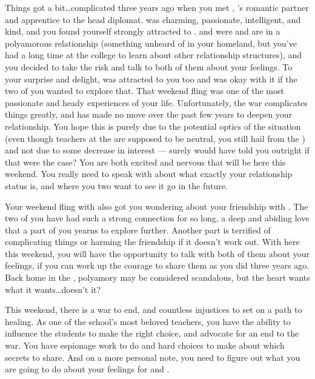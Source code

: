 \documentclass[char]{GL2020}
\begin{document}
{Things got a bit\ldots complicated three years ago when you met \cJuniorStatesman{\full}, \cBeetle{}’s romantic partner and apprentice to the head \pShippie{} diplomat. \cJuniorStatesman{} was charming, passionate, intelligent, and kind, and you found yourself strongly attracted to \cJuniorStatesman{\them}. \cJuniorStatesman{} and \cBeetle{} were and are in a polyamorous relationship (something unheard of in your homeland, but you’ve had a long time at the college to learn about other relationship structures), and you decided to take the risk and talk to both of them about your feelings. To your surprise and delight, \cJuniorStatesman{} was attracted to you too and \cBeetle{} was okay with it if the two of you wanted to explore that. That weekend fling was one of the most passionate and heady experiences of your life. Unfortunately, the war complicates things greatly, and \cJuniorStatesman{} has made no move over the past few years to deepen your relationship. You hope this is purely due to the potential optics of the situation (even though teachers at the \pSc{} are supposed to be neutral, you still hail from the \pTech{}) and not due to some decrease in interest — surely \cJuniorStatesman{} would have told you outright if that were the case? You are both excited and nervous that \cJuniorStatesman{} will be here this weekend. You really need to speak with \cJuniorStatesman{\them} about what exactly your relationship status is, and where you two want to see it go in the future.

Your weekend fling with \cJuniorStatesman{} also got you wondering about your friendship with \cBeetle{}. The two of you have had such a strong connection for so long, a deep and abiding love that a part of you yearns to explore further. Another part is terrified of complicating things or harming the friendship if it doesn’t work out. With \cJuniorStatesman{} here this weekend, you will have the opportunity to talk with both of them about your feelings, if you can work up the courage to share them as you did three years ago. Back home in the \pTech{}, polyamory may be considered scandalous, but the heart wants what it wants…doesn’t it?

This weekend, there is a war to end, and countless injustices to set on a path to healing. As one of the school's most beloved teachers, you have the ability to influence the students to make the right choice, and advocate for an end to the war. You have espionage work to do and hard choices to make about which secrets to share. And on a more personal note, you need to figure out what you are going to do about your feelings for \cJuniorStatesman{} and \cBeetle{}.

}
\end{document}
